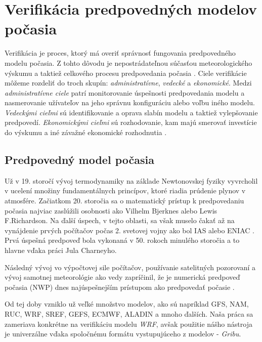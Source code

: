 \chapter{Verifikácia predpovedných modelov počasia}

Verifikácia je proces, ktorý má overiť správnosť fungovania predpovedného modelu počasia. Z tohto dôvodu je nepostrádateľnou súčasťou meteorologického výskumu a taktiež celkového procesu predpovedania počasia \cite{MET:MET52}.
Ciele verifikácie môžeme rozdeliť do troch skupín: \textit{administratívne}, \textit{vedecké} a \textit{ekonomické}.
Medzi \textit{administratívne ciele} patrí monitorovanie úspešnosti predpovedania modelu a nasmerovanie užívateľov na jeho správnu konfiguráciu alebo voľbu iného modelu. \textit{Vedeckými cieľmi} sú identifikovanie a oprava slabín modelu a taktiež vylepšovanie predpovedí. \textit{Ekonomickými cieľmi} sú rozhodovanie, kam majú smerovať investície do výskumu a iné závažné ekonomické rozhodnutia \cite{IntroToVerif}. 

\section{Predpovedný model počasia}

Už v 19. storočí vývoj termodynamiky na základe Newtonovskej fyziky vyvrcholil v ucelení množiny fundamentálnych princípov, ktoré riadia prúdenie plynov v atmosfére. 
Začiatkom 20. storočia sa o matematický prístup k predpovedaniu počasia najviac zaslúžili osobnosti ako Vilhelm Bjerknes alebo Lewis F.Richardson. Na ďalší úspech, v tejto oblasti, sa však muselo čakať až na vynájdenie prvých počítačov počas 2. svetovej vojny ako bol IAS alebo ENIAC \cite{Origins}. Prvá úspešná predpoveď bola vykonaná v 50. rokoch minulého storočia a to hlavne vďaka práci Jula Charneyho.

Následný vývoj vo výpočtovej sile počítačov, používanie satelitných pozorovaní a vývoj samotnej meteorológie ako vedy zapríčinil, že je numerická predpoveď počasia (NWP) dnes najúspešnejším prístupom ako predpovedať počasie \cite{Golding}.  

Od tej doby vzniklo už veľké množstvo modelov, ako sú napríklad GFS, NAM, RUC, WRF, SREF, GEFS, ECMWF, ALADIN a mnoho ďalších. Naša práca sa zameriava konkrétne na verifikáciu modelu \textit{WRF}, avšak použitie nášho nástroja je univerzálne vďaka spoločnému formátu vystupujúceho z modelov - \textit{Gribu}.


